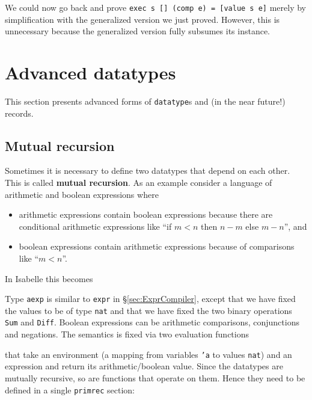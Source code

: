 We could now go back and prove \texttt{exec s [] (comp e) = [value s e]}
merely by simplification with the generalized version we just proved.
However, this is unnecessary because the generalized version fully subsumes
its instance.


\section{Advanced datatypes}

This section presents advanced forms of \texttt{datatype}s and (in the near
future!) records.

\subsection{Mutual recursion}

Sometimes it is necessary to define two datatypes that depend on each
other. This is called \textbf{mutual recursion}. As an example consider a
language of arithmetic and boolean expressions where
\begin{itemize}
\item arithmetic expressions contain boolean expressions because there are
  conditional arithmetic expressions like ``if $m<n$ then $n-m$ else $m-n$'',
  and
\item boolean expressions contain arithmetic expressions because of
  comparisons like ``$m<n$''.
\end{itemize}
In Isabelle this becomes
\begin{ttbox}
\end{ttbox}
Type \texttt{aexp} is similar to \texttt{expr} in \S\ref{sec:ExprCompiler},
except that we have fixed the values to be of type \texttt{nat} and that we
have fixed the two binary operations \texttt{Sum} and \texttt{Diff}. Boolean
expressions can be arithmetic comparisons, conjunctions and negations.
The semantics is fixed via two evaluation functions
\begin{ttbox}
\end{ttbox}
that take an environment (a mapping from variables \texttt{'a} to values
\texttt{nat}) and an expression and return its arithmetic/boolean
value. Since the datatypes are mutually recursive, so are functions that
operate on them. Hence they need to be defined in a single \texttt{primrec}
section:
\begin{ttbox}

\end{ttbox}

